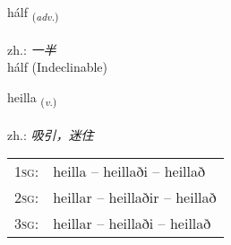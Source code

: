 \documentclass[frontgrid, backgrid]{flacards}\usepackage[]{graphicx}\usepackage[]{xcolor}
\begin{document}

\renewcommand{\flhead}{\vskip5pt \fboxsep=0pt {\small\bfseries\footnotesize Atviksorð | 副词}}
\renewcommand{\fcfoot}{\vskip5pt \fboxsep=0pt \hspace{2pt}{\small\bfseries\footnotesize 3K}}

\renewcommand{\blhead}{\vskip5pt {\small\bfseries\footnotesize Atviksorð | 副词 }}
\renewcommand{\bcfoot}{\vskip5pt \hspace{2pt}{\small\bfseries\footnotesize 3K}}


{hálf \small{\textsubscript{(\textit{adv.})}} \\[1ex]
\textphonetic{[haulv]} \\
zh.: \emph{一半} \\  [2ex]
hálf (Indeclinable)}

\renewcommand{\flhead}{\vskip5pt \fboxsep=0pt {\small\bfseries\footnotesize Sagnorð | 动词}}
\renewcommand{\fcfoot}{\vskip5pt \fboxsep=0pt \hspace{2pt}{\small\bfseries\footnotesize 3K}}

\renewcommand{\blhead}{\vskip5pt {\small\bfseries\footnotesize Sagnorð | 动词 }}
\renewcommand{\bcfoot}{\vskip5pt \hspace{2pt}{\small\bfseries\footnotesize 3K}}


{heilla \small{\textsubscript{(\textit{v.})}} \\[1ex] %
\textphonetic{[heitla]} \\
zh.: \emph{吸引，迷住} \\  [2ex]
\renewcommand*{\arraystretch}{0.8}
\begin{tabular}{p{1cm}l}
\textsc{1sg}: & heilla -- heillaði -- heillað \\ 
\textsc{2sg}: & heillar -- heillaðir -- heillað \\ 
\textsc{3sg}: & heillar -- heillaði -- heillað \\ 
\end{tabular}
}
\end{document}
